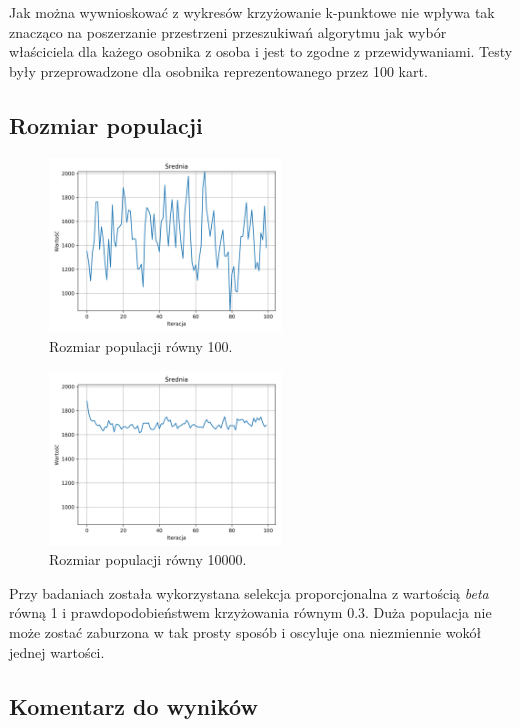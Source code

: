 \documentclass[12pt]{article}
\begin{document}
Jak można wywnioskować z wykresów krzyżowanie k-punktowe nie wpływa tak znacząco na poszerzanie przestrzeni przeszukiwań algorytmu jak wybór właściciela dla każego osobnika z osoba i jest to zgodne z przewidywaniami. Testy były przeprowadzone dla osobnika reprezentowanego przez 100 kart. 

\newpage
\subsection{Rozmiar populacji}
\begin{figure}[h]
	\centering					\includegraphics[width=0.55\textwidth]{pop_1.png}
	\caption{Rozmiar populacji równy 100.}
	\label{fig1}
\end{figure}


\begin{figure}[h]
	\centering					\includegraphics[width=0.55\textwidth]{pop_2.png}
	\caption{Rozmiar populacji równy 10000.}
	\label{fig1}
\end{figure}

Przy badaniach została wykorzystana selekcja proporcjonalna z wartością \textit{beta} równą 1 i prawdopodobieństwem krzyżowania równym 0.3. Duża populacja nie może zostać zaburzona w tak prosty sposób i oscyluje ona niezmiennie wokół jednej wartości.   

\subsection{Komentarz do wyników}
\end{document}
